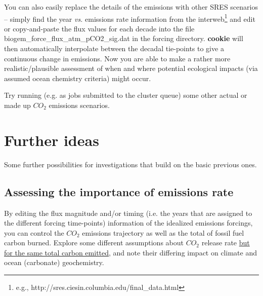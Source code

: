 \noindent You can also easily replace the details of the emissions with other SRES scenarios – simply find the year \textit{vs.} emissions rate information from the interweb\footnote{e.g., http://sres.ciesin.columbia.edu/final\_data.html} and edit or copy-and-paste the flux values for each decade into the file \footnotesize\textsf{biogem\_force\_flux\_atm\_pCO2\_sig.dat }\normalsize in the forcing directory.\textbf{ cookie} will then automatically interpolate between the decadal tie-points to give a continuous change in emissions. Now you are able to make a rather more realistic/plausible assessment of when and where potential ecological impacts (via assumed ocean chemistry criteria) might occur.

Try running (e.g. as jobs submitted to the cluster queue) some other actual or made up $CO_{2}$ emissions scenarios.

\newpage

\section{Further ideas}

Some further possibilities for investigations that build on the basic previous ones. 


\subsection{Assessing the importance of emissions rate}

By editing the flux magnitude and/or timing (i.e. the years that are assigned to the different forcing time-points) information of the idealized emissions forcings, you can control the \(CO_{2}\) emissions trajectory as well as the total of fossil fuel carbon burned. Explore some different assumptions about \(CO_{2}\) release rate \uline{but for the same total carbon emitted}, and note their differing impact on climate and ocean (carbonate) geochemistry.

\vspace{1mm}

